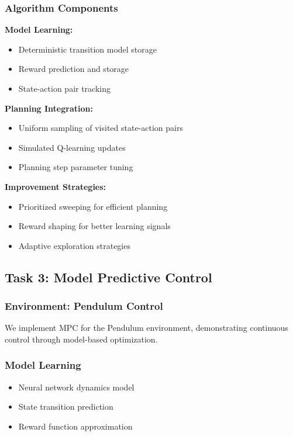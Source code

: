 \documentclass[12pt]{article}
\numberwithin{equation}{section}
\numberwithin{figure}{section}
\numberwithin{table}{section}
\numberwithin{algorithm}{section}
\begin{document}
{{{\subsubsection{Algorithm Components}

\textbf{Model Learning:}
\begin{itemize}
    \item Deterministic transition model storage
    \item Reward prediction and storage
    \item State-action pair tracking
\end{itemize}

\textbf{Planning Integration:}
\begin{itemize}
    \item Uniform sampling of visited state-action pairs
    \item Simulated Q-learning updates
    \item Planning step parameter tuning
\end{itemize}

\textbf{Improvement Strategies:}
\begin{itemize}
    \item Prioritized sweeping for efficient planning
    \item Reward shaping for better learning signals
    \item Adaptive exploration strategies
\end{itemize}

\subsection{Task 3: Model Predictive Control}

\subsubsection{Environment: Pendulum Control}
We implement MPC for the Pendulum environment, demonstrating continuous control through model-based optimization.

\subsubsection{Model Learning}
\begin{itemize}
    \item Neural network dynamics model
    \item State transition prediction
    \item Reward function approximation
\end{itemize}

}}}
\end{document}
